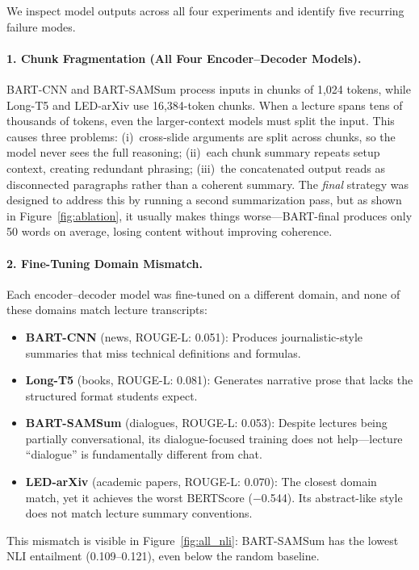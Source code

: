 We inspect model outputs across all four experiments and identify five recurring failure modes.

\paragraph{1. Chunk Fragmentation (All Four Encoder--Decoder Models).}
BART-CNN and BART-SAMSum process inputs in chunks of 1,024 tokens, while Long-T5 and LED-arXiv use 16,384-token chunks. When a lecture spans tens of thousands of tokens, even the larger-context models must split the input. This causes three problems: (i)~cross-slide arguments are split across chunks, so the model never sees the full reasoning; (ii)~each chunk summary repeats setup context, creating redundant phrasing; (iii)~the concatenated output reads as disconnected paragraphs rather than a coherent summary. The \textit{final} strategy was designed to address this by running a second summarization pass, but as shown in Figure~\ref{fig:ablation}, it usually makes things worse---BART-final produces only 50 words on average, losing content without improving coherence.

\paragraph{2. Fine-Tuning Domain Mismatch.}
Each encoder--decoder model was fine-tuned on a different domain, and none of these domains match lecture transcripts:
\begin{itemize}
    \item \textbf{BART-CNN} (news, ROUGE-L: 0.051): Produces journalistic-style summaries that miss technical definitions and formulas.
    \item \textbf{Long-T5} (books, ROUGE-L: 0.081): Generates narrative prose that lacks the structured format students expect.
    \item \textbf{BART-SAMSum} (dialogues, ROUGE-L: 0.053): Despite lectures being partially conversational, its dialogue-focused training does not help---lecture ``dialogue'' is fundamentally different from chat.
    \item \textbf{LED-arXiv} (academic papers, ROUGE-L: 0.070): The closest domain match, yet it achieves the worst BERTScore ($-$0.544). Its abstract-like style does not match lecture summary conventions.
\end{itemize}
This mismatch is visible in Figure~\ref{fig:all_nli}: BART-SAMSum has the lowest NLI entailment (0.109--0.121), even below the random baseline.

